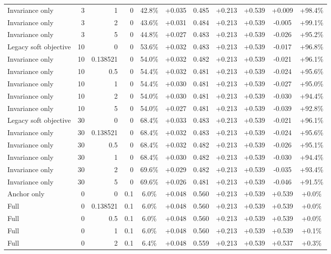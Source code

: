 \begin{table}[htbp]
\begin{tabular}{lrrrccccccc}
Invariance only & 3 & 1 & 0 & 42.8\% & +0.035 & 0.485 & +0.213 & +0.539 & +0.009 & +98.4\% \\
Invariance only & 3 & 2 & 0 & 43.6\% & +0.031 & 0.484 & +0.213 & +0.539 & -0.005 & +99.1\% \\
Invariance only & 3 & 5 & 0 & 44.8\% & +0.027 & 0.483 & +0.213 & +0.539 & -0.026 & +95.2\% \\
Legacy soft objective & 10 & 0 & 0 & 53.6\% & +0.032 & 0.483 & +0.213 & +0.539 & -0.017 & +96.8\% \\
Invariance only & 10 & 0.138521 & 0 & 54.0\% & +0.032 & 0.482 & +0.213 & +0.539 & -0.021 & +96.1\% \\
Invariance only & 10 & 0.5 & 0 & 54.4\% & +0.032 & 0.481 & +0.213 & +0.539 & -0.024 & +95.6\% \\
Invariance only & 10 & 1 & 0 & 54.4\% & +0.030 & 0.481 & +0.213 & +0.539 & -0.027 & +95.0\% \\
Invariance only & 10 & 2 & 0 & 54.0\% & +0.030 & 0.481 & +0.213 & +0.539 & -0.030 & +94.4\% \\
Invariance only & 10 & 5 & 0 & 54.0\% & +0.027 & 0.481 & +0.213 & +0.539 & -0.039 & +92.8\% \\
Legacy soft objective & 30 & 0 & 0 & 68.4\% & +0.033 & 0.483 & +0.213 & +0.539 & -0.021 & +96.1\% \\
Invariance only & 30 & 0.138521 & 0 & 68.4\% & +0.032 & 0.483 & +0.213 & +0.539 & -0.024 & +95.6\% \\
Invariance only & 30 & 0.5 & 0 & 68.4\% & +0.032 & 0.482 & +0.213 & +0.539 & -0.026 & +95.1\% \\
Invariance only & 30 & 1 & 0 & 68.4\% & +0.030 & 0.482 & +0.213 & +0.539 & -0.030 & +94.4\% \\
Invariance only & 30 & 2 & 0 & 69.6\% & +0.029 & 0.482 & +0.213 & +0.539 & -0.035 & +93.4\% \\
Invariance only & 30 & 5 & 0 & 69.6\% & +0.026 & 0.481 & +0.213 & +0.539 & -0.046 & +91.5\% \\
Anchor only & 0 & 0 & 0.1 & 6.0\% & +0.048 & 0.560 & +0.213 & +0.539 & +0.539 & +0.0\% \\
Full & 0 & 0.138521 & 0.1 & 6.0\% & +0.048 & 0.560 & +0.213 & +0.539 & +0.539 & +0.0\% \\
Full & 0 & 0.5 & 0.1 & 6.0\% & +0.048 & 0.560 & +0.213 & +0.539 & +0.539 & +0.0\% \\
Full & 0 & 1 & 0.1 & 6.0\% & +0.048 & 0.560 & +0.213 & +0.539 & +0.539 & +0.1\% \\
Full & 0 & 2 & 0.1 & 6.4\% & +0.048 & 0.559 & +0.213 & +0.539 & +0.537 & +0.3\% \\

\end{tabular}
\end{table}
